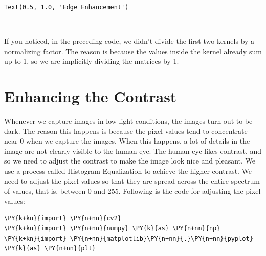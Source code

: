 \begin{tcolorbox}[breakable, size=fbox, boxrule=.5pt, pad at break*=1mm, opacityfill=0]
	\begin{Verbatim}[commandchars=\\\{\}]
Text(0.5, 1.0, 'Edge Enhancement')
	\end{Verbatim}
\end{tcolorbox}

\newpage

\begin{center}
\end{center}
{ \hspace*{\fill} \\}

If you noticed, in the preceding code, we didn't divide the first two kernels by a normalizing factor. The reason is because the values inside the kernel already sum up to 1, so we are implicitly dividing the matrices by 1.

\section{Enhancing the Contrast}
Whenever we capture images in low-light conditions, the images turn out to be dark. The reason this happens is because the pixel values tend to concentrate near 0 when we capture the images. When this happens, a lot of details in the image are not clearly visible to the human eye. The human eye likes contrast, and so we need to adjust the contrast to make the image look nice and pleasant. We use a process called Histogram Equalization to achieve the higher contrast. We need to adjust the pixel values so that they are spread across the entire spectrum of values, that is, between 0 and 255. Following is the code for adjusting the pixel values:

\vspace{0.5cm}

\begin{tcolorbox}[breakable, size=fbox, boxrule=1pt, pad at break*=1mm,colback=cellbackground, colframe=cellborder]
	\begin{Verbatim}[commandchars=\\\{\}]
\PY{k+kn}{import} \PY{n+nn}{cv2}
\PY{k+kn}{import} \PY{n+nn}{numpy} \PY{k}{as} \PY{n+nn}{np}
\PY{k+kn}{import} \PY{n+nn}{matplotlib}\PY{n+nn}{.}\PY{n+nn}{pyplot} \PY{k}{as} \PY{n+nn}{plt}
	\end{Verbatim}
\end{tcolorbox}

